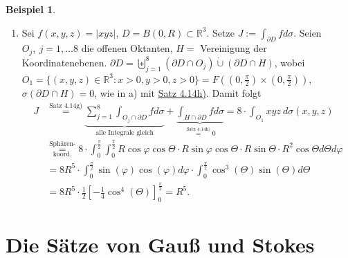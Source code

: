 \documentclass[a4paper]{scrreprt}
\newcommand{\R}{\mathbb{R}}
\newcommand{\dcup}{\dot{\cup}}
\newcommand{\bigdcup}{\biguplus}
\newcommand{\overunderset}[3]{\overset{#1}{\underset{#3}{#2}}}
\newcommand{\jlabel}[1]{\label{j_#1}}
\newcommand{\jshortlink}[1]{\jhyperref{#1}{\text{#1}}}
\newcommand{\jhyperref}[2]{\hyperref[j_#1]{#2}}
\newcommand{\jlink}[1]{\jhyperref{#1}{#1}}
\theoremstyle{plain}
\theoremstyle{definition}
\newtheorem{expl}[thm]{Beispiel}
\begin{document}
{{{{\begin{expl}
\begin{enumerate}
        \item
            \jlabel{Bsp 4.15b)}
            Sei $f(x,y,z) = |xyz|$, $D=B(0,R)\subset \R^3$. Setze $J:=\int_{\partial D} f d\sigma$. Seien $O_j,\ j=1,\dots 8$ die offenen Oktanten, $H =$ Vereinigung der Koordinatenebenen. $\partial D = \bigdcup_{j=1}^8 (\partial D \cap O_j) \dcup (\partial D \cap H)$, wobei $O_1 = \{(x,y,z)\in \R^3 : x>0, y>0, z>0\} = F\left( (0, \frac{\pi}{2}) \times (0,\frac{\pi}{2}) \right)$, $\sigma(\partial D \cap H) = 0$, wie in a) mit \jlink{Satz 4.14h)}. Damit folgt
            \[
                \begin{split}
                    J &\overset{\jshortlink{Satz 4.14g)}}{=} \underbrace{\sum_{j=1}^8 \int_{O_j\cap \partial D} f d\sigma}_{\text{alle Integrale gleich}} + \underbrace{\int_{H \cap \partial D} f d\sigma}_{\overset{\jshortlink{Satz 4.14h)}}{=} 0} = 8\cdot \int_{O_1} xyz \ d\sigma(x,y,z)\\
                    &\overunderset{\text{Sphären-}}{=}{\text{koord.}} 8\cdot \int_0^\frac{\pi}{2} \int_0^\frac{\pi}{2} R \cos\varphi \cos\Theta \cdot R \sin\varphi \cos\Theta \cdot R \sin\Theta \cdot R^2 \cos\Theta d\Theta d\varphi\\
                    &= 8 R^5 \cdot \int_0^\frac{\pi}{2} \sin(\varphi)\cos(\varphi)d\varphi \cdot \int_0^\frac{\pi}{2}\cos^3(\Theta)\sin(\Theta)d\Theta\\
                    &= 8 R^5\cdot \frac{1}{2} \left[-\frac{1}{4} \cos^4(\Theta) \right]_0^\frac{\pi}{2} = R^5.
                \end{split}
            \]
    \end{enumerate}
\end{expl}
        
\section{Die Sätze von Gauß und Stokes}

}}}}
\end{document}
